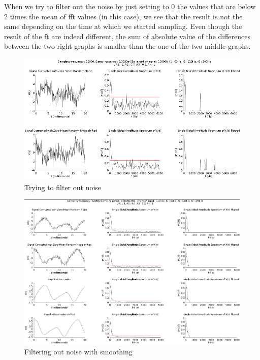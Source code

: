 When we try to filter out the noise by just setting to 0 the values that are below 2 times the mean of \acrshort{fft} values (in this case), we see that the result is not the same depending on the time at which we started sampling. Even though the result of the \acrshort{ft} are indeed different, the sum of absolute value of the differences between the two right graphs is smaller than the one of the two middle graphs.
\begin{figure}
    \centering
    \includegraphics[width=\textwidth]{img/unfiltered.png}
    \caption{Trying to filter out noise}
    \label{fig:unfiltered_signal}
\end{figure}
\begin{figure}
    \centering
    \includegraphics[trim={0 0 0 0.1cm},clip,height=0.99\textwidth, angle =90]{img/filter.png}
    \caption{Filtering out noise with smoothing}
    \label{fig:smooth_signal}
\end{figure}

